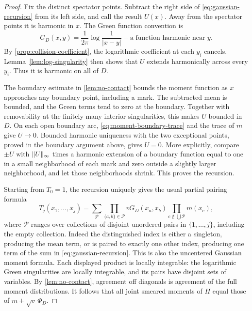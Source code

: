 \begin{proof}
Fix the distinct spectator points. Subtract the right side of
\eqref{eq:gaussian-recursion} from its left side, and call the
result $U(x)$. Away from the spectator points it is harmonic in
$x$. The Green function convention is
\[
 G_D(x,y)=\frac1{2\pi}\log\frac1{|x-y|}
                     +\text{a function harmonic near }y.
\]
By \cref{prop:collision-coefficient}, the logarithmic coefficient
at each $y_i$ cancels. Lemma~\ref{lem:log-singularity} then shows
that $U$ extends harmonically across every $y_i$. Thus it is
harmonic on all of $D$.

The boundary estimate in \cref{lem:no-contact} bounds the moment
function as $x$ approaches any boundary point, including a mark.
The subtracted mean is bounded, and the Green terms tend to zero
at the boundary. Together with removability at the finitely many
interior singularities, this makes $U$ bounded in $D$. On each
open boundary arc, \eqref{eq:moment-boundary-trace} and the trace
of $m$ give $U\to0$. Bounded harmonic uniqueness with the two
exceptional points, proved in the boundary argument above, gives
$U=0$. More explicitly, compare $\pm U$ with
$\lVert U\rVert_\infty$ times a harmonic extension of a boundary function
equal to one in a small neighborhood of each mark and zero outside
a slightly larger neighborhood, and let those neighborhoods shrink.
This proves the recursion.

Starting from $T_0=1$, the recursion uniquely gives the usual partial
pairing formula
\begin{equation}
 T_j(x_1,\ldots,x_j)
   =\sum_{\mathcal P}
       \prod_{\{a,b\}\in\mathcal P}vG_D(x_a,x_b)
       \prod_{c\notin\bigcup\mathcal P}m(x_c),
 \label{eq:partial-pairing-formula}
\end{equation}
where $\mathcal P$ ranges over collections of disjoint unordered
pairs in $\{1,\ldots,j\}$, including the empty collection.
Indeed the distinguished index is either a singleton, producing
the mean term, or is paired to exactly one other index, producing
one term of the sum in \eqref{eq:gaussian-recursion}. This is
also the uncentered Gaussian moment formula. Each displayed
product is locally integrable: the logarithmic Green singularities
are locally integrable, and its pairs have disjoint sets of
variables. By \cref{lem:no-contact}, agreement off diagonals is
agreement of the full moment distributions. It follows that all
joint smeared moments of $H$ equal those of $m+\sqrt v\,\Phi_D$.


\end{proof}
